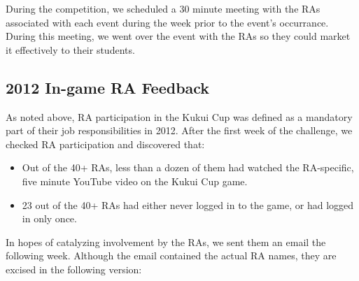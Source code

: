\documentclass[]{article}
\begin{document}
During the competition, we scheduled a 30 minute meeting with the RAs associated with each
event during the week prior to the event's occurrance.  During this meeting, we went over
the event with the RAs so they could market it effectively to their students. 

\subsection{2012 In-game RA Feedback}

As noted above, RA participation in the Kukui Cup was defined as a mandatory part of their job
responsibilities in 2012.  After the first week of the challenge, we checked RA
participation and discovered that:
\begin{itemize}[noitemsep]
\item Out of the 40+ RAs, less than a dozen of them had watched the RA-specific, five
  minute YouTube video on the Kukui Cup game.
\item 23 out of the 40+ RAs had either never logged in to the game, or had logged in only
  once.
\end{itemize}

In hopes of catalyzing involvement by the RAs, we sent them an email the following week.
Although the email contained the actual RA names, they are excised in the following version:
\end{document}
